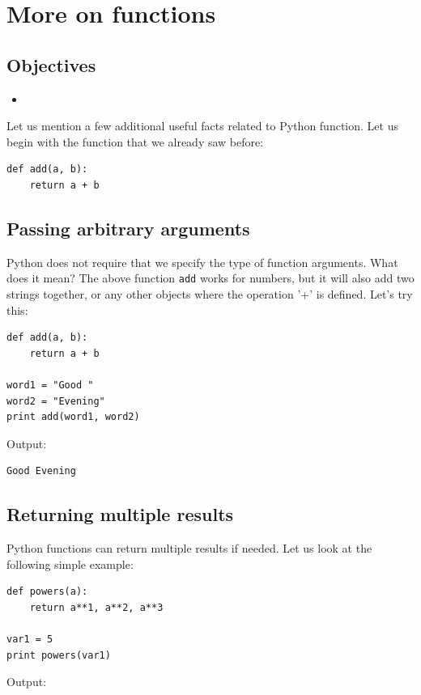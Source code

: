 \section{More on functions}

\subsection{Objectives}

\begin{itemize}
\item
\end{itemize}

Let us mention a few additional useful facts related to 
Python function. Let us begin with the function that we already saw
before:

\begin{verbatim}
def add(a, b):
    return a + b
\end{verbatim}

\subsection{Passing arbitrary arguments}

Python does not require that we specify the type of function arguments. 
What does it mean? The above function {\tt add} works for 
numbers, but it will also add two strings together, or any other 
objects where the operation '+' is defined. Let's try this:

\begin{verbatim}
def add(a, b):
    return a + b

word1 = "Good "
word2 = "Evening"
print add(word1, word2)
\end{verbatim}
Output:

\begin{verbatim}
Good Evening
\end{verbatim}

\subsection{Returning multiple results}

Python functions can return multiple results if needed.
Let us look at the following simple example:

\begin{verbatim}
def powers(a):
    return a**1, a**2, a**3

var1 = 5
print powers(var1)
\end{verbatim}
Output:

